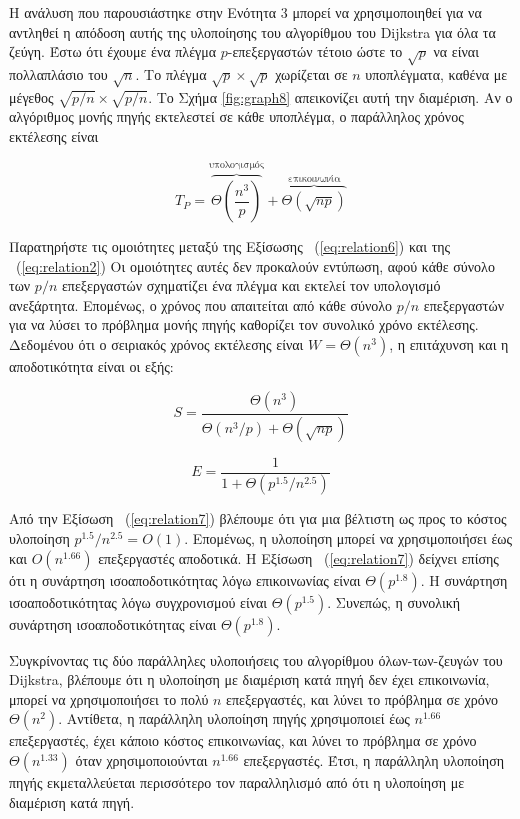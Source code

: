 \documentclass[12pt,a4paper]{article}
\begin{document}
Η ανάλυση που παρουσιάστηκε στην Ενότητα 3 μπορεί να χρησιμοποιηθεί για να αντληθεί η απόδοση αυτής της υλοποίησης του αλγορίθμου του \foreignlanguage{english}{Dijkstra} για όλα τα ζεύγη. Έστω ότι έχουμε ένα πλέγμα $p$-επεξεργαστών τέτοιο ώστε το $\sqrt{p}$ να είναι πολλαπλάσιο του $\sqrt{n}$. Το πλέγμα $\sqrt{p}\times\sqrt{p}$ χωρίζεται σε $n$ υποπλέγματα, καθένα με μέγεθος $\sqrt{p/n}\times\sqrt{p/n}$. Το Σχήμα \ref{fig:graph8} απεικονίζει αυτή την διαμέριση. Αν ο αλγόριθμος μονής πηγής εκτελεστεί σε κάθε υποπλέγμα, ο παράλληλος χρόνος εκτέλεσης είναι

\begin{equation}
T_P = \overbrace{\Theta\!\left(\frac{n^3}{p}\right)}^{\text{υπολογισμός}} 
+ \overbrace{\Theta\!\left({\sqrt{n p}}\right)}^{\text{επικοινωνία}}
\label{eq:relation6}
\end{equation}


Παρατηρήστε τις ομοιότητες μεταξύ της Εξίσωσης ~(\ref{eq:relation6}) και της ~(\ref{eq:relation2}) Οι ομοιότητες αυτές δεν προκαλούν εντύπωση, αφού κάθε σύνολο των $p/n$ επεξεργαστών σχηματίζει ένα πλέγμα και εκτελεί τον υπολογισμό ανεξάρτητα. Επομένως, ο χρόνος που απαιτείται από κάθε σύνολο $p/n$ επεξεργαστών για να λύσει το πρόβλημα μονής πηγής καθορίζει τον συνολικό χρόνο εκτέλεσης. Δεδομένου ότι ο σειριακός χρόνος εκτέλεσης είναι $W = \Theta(n^3)$, η επιτάχυνση και η αποδοτικότητα είναι οι εξής:

\[
S = \frac{\Theta(n^3)}{\Theta(n^3/p) + \Theta(\sqrt{np})}
\]

\begin{equation}
E = \frac{1}{1 + \Theta(p^{1.5}/n^{2.5})}
\label{eq:relation7}
\end{equation}


Από την Εξίσωση ~(\ref{eq:relation7}) βλέπουμε ότι για μια βέλτιστη ως προς το κόστος υλοποίηση $p^{1.5}/n^{2.5} = O(1)$. Επομένως, η υλοποίηση μπορεί να χρησιμοποιήσει έως και $O(n^{1.66})$ επεξεργαστές αποδοτικά. Η Εξίσωση ~(\ref{eq:relation7}) δείχνει επίσης ότι η συνάρτηση ισοαποδοτικότητας λόγω επικοινωνίας είναι $\Theta(p^{1.8})$. Η συνάρτηση ισοαποδοτικότητας λόγω συγχρονισμού είναι $\Theta(p^{1.5})$. Συνεπώς, η συνολική συνάρτηση ισοαποδοτικότητας είναι $\Theta(p^{1.8})$. 

Συγκρίνοντας τις δύο παράλληλες υλοποιήσεις του αλγορίθμου όλων-των-ζευγών του \foreignlanguage{english}{Dijkstra}, βλέπουμε ότι η υλοποίηση με διαμέριση κατά πηγή δεν έχει επικοινωνία, μπορεί να χρησιμοποιήσει το πολύ $n$ επεξεργαστές, και λύνει το πρόβλημα σε χρόνο $\Theta(n^2)$. Αντίθετα, η παράλληλη υλοποίηση πηγής χρησιμοποιεί έως $n^{1.66}$ επεξεργαστές, έχει κάποιο κόστος επικοινωνίας, και λύνει το πρόβλημα σε χρόνο $\Theta(n^{1.33})$ όταν χρησιμοποιούνται $n^{1.66}$ επεξεργαστές. Έτσι, η παράλληλη υλοποίηση πηγής εκμεταλλεύεται περισσότερο τον παραλληλισμό από ότι η υλοποίηση με διαμέριση κατά πηγή.
\end{document}
